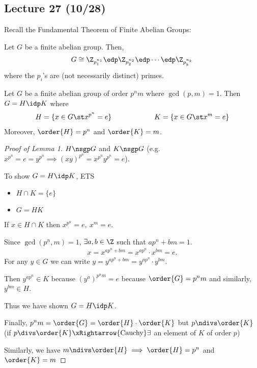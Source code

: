 \subsection*{Lecture 27 (10/28)} %
Recall the Fundamental Theorem of Finite Abelian Groups:
 \begin{theorem} Let \(G\) be a finite abelian group. Then,
     \begin{align*}
         G\cong \Z_{p_1^{n_1}}\edp \Z_{p_2^{n_2}}\edp\cdots\edp \Z_{p_k^{n_k}}
     \end{align*}
     where the \(p_i\)'s are (not necessarily distinct) primes.
 \end{theorem}

 \begin{lemma}
 Let \(G\) be a finite abelian group of order \(p^n m\) where \(\gcd(p,m)=1\). Then \(G = H\idp K\) where \begin{align*}
     H=\{x\in G\st x^{p^n}=e\} \qquad\qquad\qquad K = \{x\in G \st x^m = e\}
 \end{align*}
 Moreover, \(\order{H} = p^n\) and \(\order{K} = m\).
 \end{lemma}
 \begin{proof}[Proof of Lemma 1]
     \(H\nsgp G\) and \(K\nsgp G\) (e.g. \(x^{p^n}=e=y^{p^n}\implies (xy)^{p^n}=x^{p^n}y^{p^n}=e\)).

     To show \(G = H \idp K\), ETS \begin{itemize}
         \item \(H\cap K = \{e\}\)
         \item \(G = HK\)
     \end{itemize}

     If \(x\in H\cap K\) then \(x^{p^n} = e, \  x^m = e\).

     Since \(\gcd(p^n, m) = 1\), \(\exists a,b\in\Z\) such that \(ap^n+bm = 1\).
     \begin{align*}
         x = x^{ap^n+bm} = x^{ap^n}\cdot x^{bm} = e.
     \end{align*}
     For any \(y\in G\) we can write \(y = y^{ap^n+bm} = y^{ap^n}\cdot y^{bm}\).

     Then \(y^{ap^n}\in K\) because \((y^a)^{p^n m} = e\) because \(\order{G} = p^n m\) and similarly, \(y^{bm}\in H\).

     Thus we have shown \(G=H\idp K\).

     Finally, \(p^nm = \order{G} = \order{H}\cdot\order{K}\) but \(p\ndivs \order{K}\) (if \(p\divs \order{K} \xRightarrow{\text{Cauchy}} \exists\) an element of \(K\) of order \(p\))

     Similarly, we have \(m\ndivs \order{H} \implies \order{H}=p^n\) and \(\order{K} = m\)
 \end{proof}

